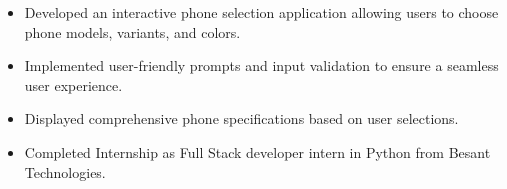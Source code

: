 \documentclass[10pt,a4paper,ragged2e]{altacv}
\begin{document}
\begin{itemize}
\item Developed an interactive phone selection application allowing users to choose phone models, variants, and colors.
\item  Implemented user-friendly prompts and input validation to ensure a seamless user experience.
\item Displayed comprehensive phone specifications based on user selections. 

\end{itemize}

\begin{itemize}
\item Completed Internship as Full Stack developer intern in Python from Besant Technologies.
\end{itemize}





%


\end{document}
